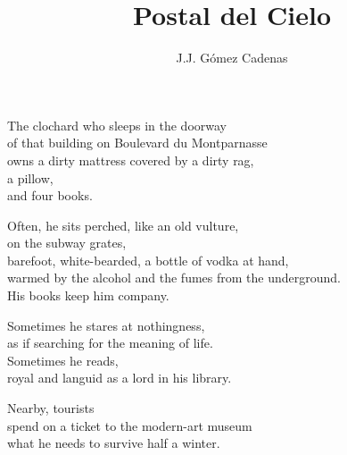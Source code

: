 \documentclass[12pt,twoside]{article}
\title{Postal del Cielo}
\author{J.J. Gómez Cadenas}
\begin{document}
\maketitle

\begin{poem}
\begin{stanza}
The clochard who sleeps in the doorway\\
of that building on Boulevard du Montparnasse\\
owns a dirty mattress covered by a dirty rag,\\
a pillow,\\
and four books.
\end{stanza}
\begin{stanza}
Often, he sits perched, like an old vulture,\\
on the subway grates,\\
barefoot, white-bearded, a bottle of vodka at hand,\\
warmed by the alcohol and the fumes from the underground.\\
His books keep him company.
\end{stanza}
\begin{stanza}
Sometimes he stares at nothingness,\\
as if searching for the meaning of life.\\
Sometimes he reads,\\
royal and languid as a lord in his library.
\end{stanza}
\begin{stanza}
Nearby, tourists\\
spend on a ticket to the modern-art museum\\
what he needs to survive half a winter.
\end{stanza}
\end{poem}
\end{document}
